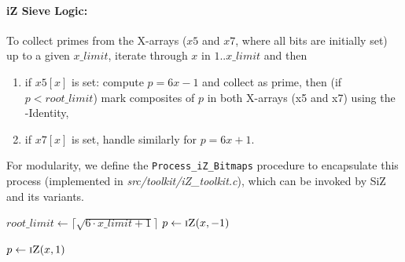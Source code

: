 \documentclass{article}
\begin{document}
 \paragraph{iZ Sieve Logic:}
To collect primes from the X-arrays ($x5$ and $x7$, where all bits are initially set) up to a given $x\_limit$, iterate through $x$ in $1..x\_limit$ and then
\begin{enumerate}
    \item if $x5[x]$ is set: compute $p=6x-1$ and collect as prime, then (if $p < root\_limit$) mark composites of $p$ in both X-arrays (x5 and x7) using the \Xp-Identity,
    \item if $x7[x]$ is set, handle similarly for $p = 6x+1$.
\end{enumerate} 
For modularity, we define the \texttt{Process\_iZ\_Bitmaps} procedure to encapsulate this process (implemented in \emph{src/toolkit/iZ\_toolkit.c}), which can be invoked by SiZ and its variants.
\begin{algorithmic}[1]
        \State $root\_limit \gets \lceil\sqrt{6 \cdot x\_limit + 1}\rceil$ 
         
             
                \State $p \gets \Call{iZ}{x, -1}$
                \State {} 
                 
                    \State {}
                    \State {}
                \EndIf
            \EndIf

             
                \State $p \gets \Call{iZ}{x, 1}$
                \State {}
                    \State {}
                    \State {}
                \EndIf
            \EndIf
        \EndFor
    \EndProcedure
\end{algorithmic}
\end{document}
